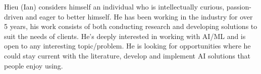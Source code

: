 Hieu (Ian) considers himself an individual who is intellectually curious, passion-driven and eager
to better himself. He has been working in the industry for over 5 years, his work consists
of both conducting research and developing solutions to suit the needs of clients. He's deeply
interested in working with AI/ML and is open to any interesting topic/problem. He is looking for
opportunities where he could stay current with the literature, develop and implement AI solutions that people enjoy using.